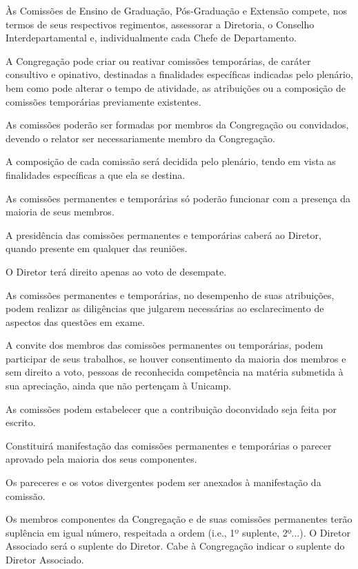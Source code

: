 \documentclass{documento}
\begin{document}
\paragrafounico Às Comissões de Ensino de Graduação, Pós-Graduação e Extensão compete, nos termos de seus respectivos regimentos, assessorar a Diretoria, o Conselho Interdepartamental e, individualmente cada Chefe de Departamento.

\artigo A Congregação pode criar ou reativar comissões temporárias, de caráter consultivo e opinativo, destinadas a finalidades específicas indicadas pelo plenário, bem como pode alterar o tempo de atividade, as atribuições ou a composição de comissões temporárias previamente existentes.

\paragrafo As comissões poderão ser formadas por membros da Congregação ou convidados, devendo o relator ser necessariamente membro da Congregação.

\paragrafo A composição de cada comissão será decidida pelo plenário, tendo em vista as finalidades específicas a que ela se destina.

\artigo As comissões permanentes e temporárias só poderão funcionar com a presença da maioria de seus membros.

\paragrafo A presidência das comissões permanentes e temporárias caberá ao Diretor, quando presente em qualquer das reuniões.

\paragrafo O Diretor terá direito apenas ao voto de desempate.

\artigo As comissões permanentes e temporárias, no desempenho de suas atribuições, podem realizar as diligências que julgarem necessárias ao esclarecimento de aspectos das questões em exame.

\artigo A convite dos membros das comissões permanentes ou temporárias, podem participar de seus trabalhos, se houver consentimento da maioria dos membros e sem direito a voto, pessoas de reconhecida competência na matéria submetida à sua apreciação, ainda que não pertençam à Unicamp.

\paragrafounico As comissões podem estabelecer que a contribuição doconvidado seja feita por escrito.

\artigo Constituirá manifestação das comissões permanentes e temporárias o parecer aprovado pela maioria dos seus componentes.

\paragrafounico Os pareceres e os votos divergentes podem ser anexados à manifestação da comissão.


\artigo Os membros componentes da Congregação e de suas comissões permanentes terão suplência em igual número, respeitada a ordem (i.e., 1º suplente, 2º...). O Diretor Associado será o suplente do Diretor. Cabe à Congregação indicar o suplente do Diretor Associado.
\end{document}
